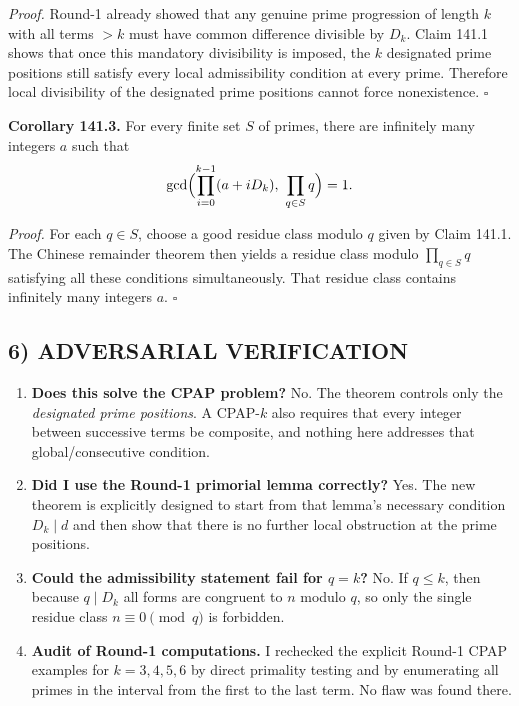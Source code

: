 \smallskip
\noindent\emph{Proof.}
Round-1 already showed that any genuine prime progression of length $k$ with all terms $>k$ must have common difference divisible by $D_k$.  Claim 141.1 shows that once this mandatory divisibility is imposed, the $k$ designated prime positions still satisfy every local admissibility condition at every prime.  Therefore local divisibility of the designated prime positions cannot force nonexistence.
\hfill$\square$

\medskip
\noindent\textbf{Corollary 141.3.}  For every finite set $S$ of primes, there are infinitely many integers $a$ such that
\[
\gcd\Bigl(\prod_{i=0}^{k-1}(a+iD_k),\ \prod_{q\in S} q\Bigr)=1.
\]

\smallskip
\noindent\emph{Proof.}
For each $q\in S$, choose a good residue class modulo $q$ given by Claim 141.1.  The Chinese remainder theorem then yields a residue class modulo $\prod_{q\in S} q$ satisfying all these conditions simultaneously.  That residue class contains infinitely many integers $a$.
\hfill$\square$

\subsection*{6) ADVERSARIAL VERIFICATION}
\begin{enumerate}
\item \textbf{Does this solve the CPAP problem?}  No.  The theorem controls only the \emph{designated prime positions}.  A CPAP-$k$ also requires that every integer between successive terms be composite, and nothing here addresses that global/consecutive condition.

\item \textbf{Did I use the Round-1 primorial lemma correctly?}  Yes.  The new theorem is explicitly designed to start from that lemma's necessary condition $D_k\mid d$ and then show that there is no further local obstruction at the prime positions.

\item \textbf{Could the admissibility statement fail for $q=k$?}  No.  If $q\le k$, then because $q\mid D_k$ all forms are congruent to $n$ modulo $q$, so only the single residue class $n\equiv 0\pmod q$ is forbidden.

\item \textbf{Audit of Round-1 computations.}  I rechecked the explicit Round-1 CPAP examples for $k=3,4,5,6$ by direct primality testing and by enumerating all primes in the interval from the first to the last term.  No flaw was found there.
\end{enumerate}

